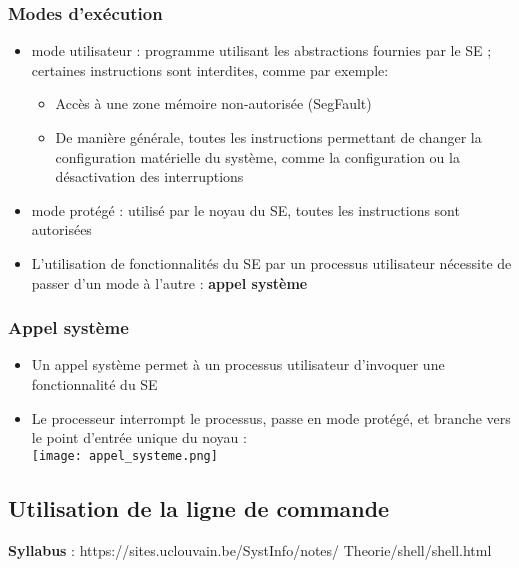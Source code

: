 \documentclass{article}
\begin{document}
        \subsubsection{Modes d'exécution}
            \begin{itemize}
                \item mode utilisateur : programme utilisant les abstractions
                fournies par le SE ; certaines instructions sont interdites, comme par exemple:
                \begin{itemize}
                    \item Accès à une zone mémoire non-autorisée (SegFault)
                    \item De manière générale, toutes les instructions permettant de
                    changer la configuration matérielle du système, comme la
                    configuration ou la désactivation des interruptions
                \end{itemize}
                \item mode protégé : utilisé par le noyau du SE, toutes les
                instructions sont autorisées
                \item L’utilisation de fonctionnalités du SE par un processus
                utilisateur nécessite de passer d’un mode à l’autre : \textbf{appel système}
            \end{itemize}
        
        \subsubsection{Appel système}
            \begin{itemize}
                \item Un appel système permet à un processus utilisateur
                d’invoquer une fonctionnalité du SE
                \item Le processeur interrompt le processus, passe en mode
                protégé, et branche vers le point d’entrée unique du noyau :\\
                \texttt{[image: appel\_systeme.png]}
            \end{itemize}
                

    \subsection{Utilisation de la ligne de commande}
    \textbf{Syllabus} : https://sites.uclouvain.be/SystInfo/notes/
    Theorie/shell/shell.html
\end{document}
